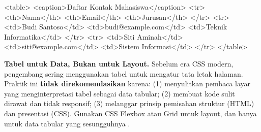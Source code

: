 \begin{webcode}[language=HTML, caption={Tabel dasar dengan header dan caption}]
<table>
  <caption>Daftar Kontak Mahasiswa</caption>
  <tr>
    <th>Nama</th>
    <th>Email</th>
    <th>Jurusan</th>
  </tr>
  <tr>
    <td>Budi Santoso</td>
    <td>budi@example.com</td>
    <td>Teknik Informatika</td>
  </tr>
  <tr>
    <td>Siti Aminah</td>
    <td>siti@example.com</td>
    <td>Sistem Informasi</td>
  </tr>
</table>
\end{webcode}

\begin{konsep}
\textbf{Tabel untuk Data, Bukan untuk Layout.} Sebelum era CSS modern, pengembang sering menggunakan tabel untuk mengatur tata letak halaman. Praktik ini \textbf{tidak direkomendasikan} karena: (1) menyulitkan pembaca layar yang menginterpretasi tabel sebagai data tabular; (2) membuat kode sulit dirawat dan tidak responsif; (3) melanggar prinsip pemisahan struktur (HTML) dan presentasi (CSS). Gunakan CSS Flexbox atau Grid untuk layout, dan  hanya untuk data tabular yang sesungguhnya \cite{webdevHtml}.
\end{konsep}

